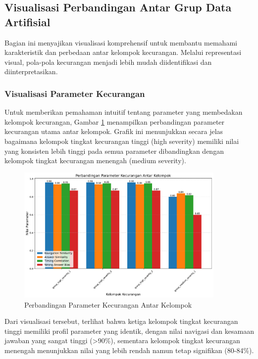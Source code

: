 \subsection{Visualisasi Perbandingan Antar Grup Data Artifisial}
\label{subsec:visualisasiPerbandinganGrup}

Bagian ini menyajikan visualisasi komprehensif untuk membantu memahami karakteristik dan perbedaan antar kelompok kecurangan. Melalui representasi visual, pola-pola kecurangan menjadi lebih mudah diidentifikasi dan diinterpretasikan.

\subsubsection{Visualisasi Parameter Kecurangan}

Untuk memberikan pemahaman intuitif tentang parameter yang membedakan kelompok kecurangan, Gambar \ref{fig:cheat_params_comparison} menampilkan perbandingan parameter kecurangan utama antar kelompok. Grafik ini menunjukkan secara jelas bagaimana kelompok tingkat kecurangan tinggi (high severity) memiliki nilai yang konsisten lebih tinggi pada semua parameter dibandingkan dengan kelompok tingkat kecurangan menengah (medium severity).

\begin{figure}[htbp]
    \centering
    \includegraphics[width=0.9\textwidth]{figures/cheat_params_comparison.pdf}
    \caption{Perbandingan Parameter Kecurangan Antar Kelompok}
    \label{fig:cheat_params_comparison}
\end{figure}

Dari visualisasi tersebut, terlihat bahwa ketiga kelompok tingkat kecurangan tinggi memiliki profil parameter yang identik, dengan nilai navigasi dan kesamaan jawaban yang sangat tinggi (>90\%), sementara kelompok tingkat kecurangan menengah menunjukkan nilai yang lebih rendah namun tetap signifikan (80-84\%).

